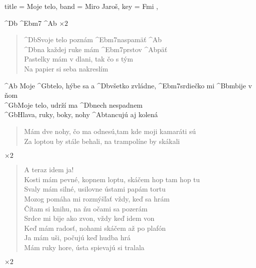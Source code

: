 \begin{song}[
    remember-chords = true ,
    verse/numbered = true ,
    transpose-capo = true 
  ]{
    title = Moje telo,
    band = Miro Jaroš,
    key  = Fmi ,
  }
  
	\begin{intro}
	^{Db} ^{Ebm7} ^{Ab} $\times2$
	\end{intro}  
  
	\begin{verse}
	^{Db}Svoje telo poznám ^{Ebm7}naspamäť ^{Ab} \\
	^{Db}na každej ruke mám ^{Ebm7}prstov ^{Ab}päť \\
	Pastelky mám v dlani, tak čo s tým \\
	Na papier si seba nakreslím
	\end{verse}
	
	\begin{chorus}
	^{Ab} Moje ^{Gb}telo, hýbe sa a ^{Db}všetko zvládne, ^{Ebm7}srdiečko mi ^{Bbm}bije v ňom \\
	^{Gb}Moje telo, udrží ma ^{Db}nech nespadnem \\
	^{Gb}Hlava, ruky, boky, nohy ^{Ab}tancujú aj kolená
	\end{chorus}
	
	\begin{chorus}
	\end{chorus}
	
	\begin{verse}
	Mám dve nohy, čo ma odnesú,tam kde moji kamaráti sú \\
	Za loptou by stále behali, na trampolíne by skákali
	\end{verse}
	
	\begin{chorus}
	$\times2$
	\end{chorus}
	
	\begin{verse}
	A teraz idem ja! \\
	Kosti mám pevné, kopnem loptu, skáčem hop tam hop tu \\
	Svaly mám silné, usilovne ústami papám tortu \\
	Mozog pomáha mi rozmýšľať vždy, keď sa hrám \\
	Čítam si knihu, na ňu očami sa pozerám \\
	Srdce mi bije ako zvon, vždy keď idem von \\
	Keď mám radosť, nohami skáčem až po plafón \\
	Ja mám uši, počujú keď hudba hrá \\
	Mám ruky hore, ústa spievajú si tralala
	\end{verse}
	
	\begin{chorus}
	$\times2$
	\end{chorus}
	
\end{song}